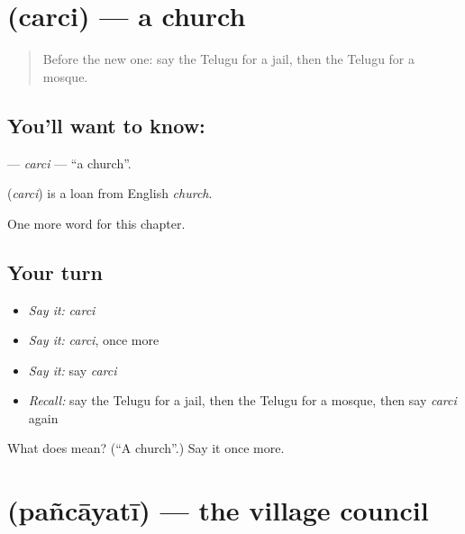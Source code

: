 \section[\texorpdfstring{\te{చర్చి} (carci)}{చర్చి (carci)}]{ (carci) — a church}

\label{lesson:TE-C293-carci}



\begin{quote}
Before the new one: say the Telugu for a jail, then the Telugu for a mosque.
\end{quote}

\subsection*{You'll want to know: }
\textbf{} — \emph{carci} — \textquotedblleft{}a church\textquotedblright{}.

\begin{cousinweb}
\textbf{} (\emph{carci}) is a loan from English \emph{church}.
\end{cousinweb}

\begin{grammarlens}[title={What you've built}]
One more word for this chapter.
\end{grammarlens}

\subsection*{Your turn}
\begin{itemize}
\raggedright
  \item \emph{Say it:} \emph{carci}
  \item \emph{Say it:} \emph{carci}, once more
  \item \emph{Say it:} say \emph{carci}
  \item \emph{Recall:} say the Telugu for a jail, then the Telugu for a mosque, then say \emph{carci} again
\end{itemize}

\begin{tcolorbox}[breakable,colback=teal!4,colframe=teal!35!black,title={Before you move on}]
What does  mean? (\textquotedblleft{}A church\textquotedblright{}.) Say it once more.
\end{tcolorbox}
\section[\texorpdfstring{\te{పంచాయతీ} (pañcāyatī)}{పంచాయతీ (pañcāyatī)}]{ (pañcāyatī) — the village council}

